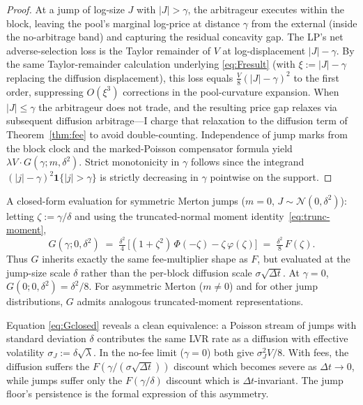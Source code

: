 \documentclass[runningheads]{llncs}
\newcommand{\dt}{\Delta t}
\newcommand{\1}{\mathbf{1}}
\begin{document}
\begin{proof}
At a jump of log-size $J$ with $|J|>\gamma$, the arbitrageur executes within the block, leaving the pool's marginal log-price at distance $\gamma$ from the external (inside the no-arbitrage band) and capturing the residual concavity gap. The LP's net adverse-selection loss is the Taylor remainder of $V$ at log-displacement $|J|-\gamma$. By the same Taylor-remainder calculation underlying \eqref{eq:Fresult} (with $\xi := |J|-\gamma$ replacing the diffusion displacement), this loss equals $\tfrac{V}{8}(|J|-\gamma)^2$ to the first order, suppressing $O(\xi^3)$ corrections in the pool-curvature expansion. When $|J| \leq \gamma$ the arbitrageur does not trade, and the resulting price gap relaxes via subsequent diffusion arbitrage---I charge that relaxation to the diffusion term of Theorem~\ref{thm:fee} to avoid double-counting. Independence of jump marks from the block clock and the marked-Poisson compensator formula yield $\lambda V \cdot G(\gamma;m,\delta^2)$. Strict monotonicity in $\gamma$ follows since the integrand $(|j|-\gamma)^2 \1\{|j|>\gamma\}$ is strictly decreasing in $\gamma$ pointwise on the support.
\end{proof}

A closed-form evaluation for symmetric Merton jumps ($m=0$, $J \sim \mathcal{N}(0,\delta^2)$): letting $\zeta := \gamma/\delta$ and using the truncated-normal moment identity~\eqref{eq:trunc-moment},
\begin{equation}\label{eq:Gclosed}
G(\gamma; 0, \delta^2) \;=\; \tfrac{\delta^2}{4}\,\big[(1+\zeta^2)\,\Phi(-\zeta) - \zeta\,\varphi(\zeta)\big] \;=\; \tfrac{\delta^2}{8}\,F(\zeta).
\end{equation}
Thus $G$ inherits exactly the same fee-multiplier shape as $F$, but evaluated at the jump-size scale $\delta$ rather than the per-block diffusion scale $\sigma\sqrt{\dt}$. At $\gamma=0$, $G(0;0,\delta^2) = \delta^2/8$. For asymmetric Merton ($m \neq 0$) and for other jump distributions, $G$ admits analogous truncated-moment representations.

\begin{remark}\label{rem:lvrequivalence}
Equation \eqref{eq:Gclosed} reveals a clean equivalence: a Poisson stream of jumps with standard deviation $\delta$ contributes the same LVR rate as a diffusion with effective volatility $\sigma_J := \delta\sqrt{\lambda}$. In the no-fee limit ($\gamma=0$) both give $\sigma_J^2 V/8$. With fees, the diffusion suffers the $F(\gamma/(\sigma\sqrt{\dt}))$ discount which becomes severe as $\dt \to 0$, while jumps suffer only the $F(\gamma/\delta)$ discount which is $\dt$-invariant. The jump floor's persistence is the formal expression of this asymmetry.
\end{remark}
\end{document}
